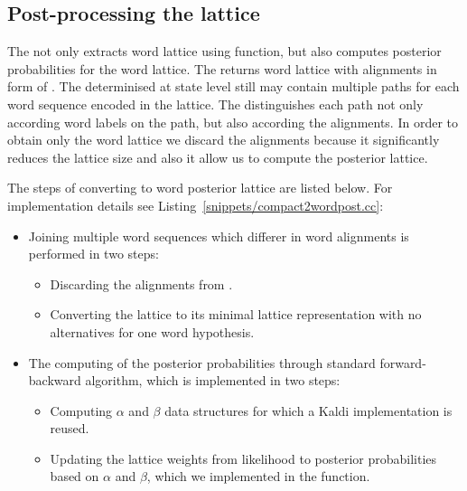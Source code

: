\subsection{Post-processing the lattice}
\label{sub:postprocess}
The  not only extracts word lattice using  function, but also computes posterior probabilities for the word lattice.
The  returns word lattice with alignments in form of .
The  determinised at state level still may contain multiple paths for each word sequence encoded in the lattice.
The  distinguishes each path not only according word labels on the path, but also according the alignments.
In order to obtain only the word lattice we discard the alignments because it significantly reduces the lattice size and also it allow us to compute the posterior lattice.

%


The steps of converting  to word posterior lattice are listed below. For implementation details see Listing~\ref{snippets/compact2wordpost.cc}:
\begin{itemize}
    \item Joining multiple word sequences which differer in word alignments is performed in two steps:
    \begin{itemize}
        \item Discarding the alignments from .
        \item Converting the lattice to its minimal lattice representation with no alternatives for one word hypothesis. 
    \end{itemize}
    \item The computing of the posterior probabilities through standard forward-backward algorithm, which is implemented in two steps:
    \begin{itemize}
        \item Computing $\alpha$ and $\beta$ data structures for which a Kaldi implementation is reused.
        \item Updating the lattice weights from likelihood to posterior probabilities based on $\alpha$ and $\beta$, which we implemented in the  function.
    \end{itemize}
\end{itemize}

